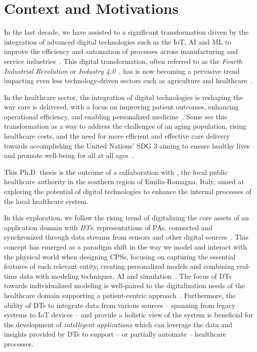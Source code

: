 \glsresetall

\section*{Context and Motivations}

In the last decade, we have assisted to a significant transformation driven by the integration of advanced digital technologies such as the \ac{IoT}, \ac{AI} and \ac{ML} to improve the efficiency and automation of processes across manufacturing and service industries~\missingref{}.
This digital transformation, often referred to as the \emph{Fourth Industrial Revolution} or \emph{Industry 4.0}~\missingref{}, has 
is now becoming a pervasive trend impacting even less technology-driven sectors such as agriculture and healthcare~\missingref{}.

In the healthcare sector, the integration of digital technologies is reshaping the way care is delivered, with a focus on improving patient outcomes, enhancing operational efficiency, and enabling personalized medicine~\missingref{}.
%
Some see this transformation as a way to address the challenges of an aging population, rising healthcare costs, and the need for more efficient and effective care delivery towards accomplishing the United Nations' \ac{SDG} 3 aiming to ensure healthy lives and promote well-being for all at all ages~\cite{un_sdg_report_2025}.

This Ph.D. thesis is the outcome of a collaboration with \auslLong{}, the local public healthcare authority in the southern region of Emilia-Romagna, Italy, aimed at exploring the potential of digital technologies to enhance the internal processes of the local healthcare system. 

In this exploration, we follow the rising trend of digitalizing the core assets of an application domain with \emph{\acp{DT}}: representations of \acp{PA}, connected and synchronized through data streams from sensors and other digital sources~\missingref{}.
%
This concept has emerged as a paradigm shift in the way we model and interact with the physical world when designing \acp{CPS}, focusing on capturing the essential features of each relevant entity, creating personalized models and combining real-time data with modeling techniques, \ac{AI} and simulation~\missingref{}.
%
The focus of \acp{DT} towards individualized modeling is well-paired to the digitalization needs of the healthcare domain supporting a patient-centric approach~\missingref{}.
%
Furthermore, the ability of \acp{DT} to integrate data from various sources
-- spanning from legacy systems to \ac{IoT} devices --
and provide a holistic view of the system is beneficial for the development of \emph{intelligent applications} which can leverage the data and insights provided by \acp{DT} to support -- or partially automate -- healthcare processes.

